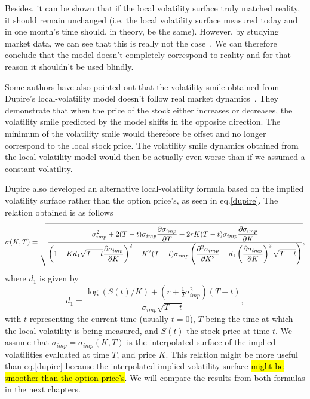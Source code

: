 Besides, it can be shown that if the local volatility surface truly matched reality, it should remain unchanged (i.e. the local volatility surface measured today and in one month's time should, in theory, be the same). However, by studying market data, we can see that this is really not the case~\cite{Wilmott3}. We can therefore conclude that the model doesn't completely correspond to reality and for that reason it shouldn't be used blindly.


Some authors have also pointed out that the volatility smile obtained from Dupire's local-volatility model doesn't follow real market dynamics~\cite{Hagan}. They demonstrate that when the price of the stock either increases or decreases, the volatility smile predicted by the model shifts in the opposite direction. The minimum of the volatility smile would therefore be offset and no longer correspond to the local stock price. The volatility smile dynamics obtained from the local-volatility model would then be actually even worse than if we assumed a constant volatility.


Dupire also developed an alternative local-volatility formula based on the implied volatility surface rather than the option price's, as seen in eq.\ref{dupire}.
The relation obtained is as follows
\begin{equation}\label{dupire2}
\sigma(K,T)=\sqrt{\frac{\displaystyle\sigma_{imp}^2+2(T-t)\sigma_{imp}\pdv{\sigma_{imp}}{T}+2rK(T-t)\sigma_{imp}\pdv{\sigma_{imp}}{K}}{\displaystyle\left(1+Kd_1\sqrt{T-t}\pdv{\sigma_{imp}}{K}\right)^2+K^2(T-t)\sigma_{imp}\left(\pdv{^2\sigma_{imp}}{K^2}-d_1\left(\pdv{\sigma_{imp}}{K}\right)^2\sqrt{T-t}\right)}},
\end{equation}
\noindent where $d_1$ is given by
\begin{equation}
d_1=\frac{\log(S(t)/K)+\left(r+\frac{1}{2}\sigma_{imp}^2\right)(T-t)}{\sigma_{imp}\sqrt{T-t}},
\end{equation}
\noindent with $t$ representing the current time (usually $t=0$), $T$ being the time at which the local volatility is being measured, and $S(t)$ the stock price at time $t$. We assume that $\sigma_{imp}=\sigma_{imp}(K,T)$ is the interpolated surface of the implied volatilities evaluated at time $T$, and price $K$.
This relation might be more useful than eq.\eqref{dupire} because the interpolated implied volatility surface \hl{might be smoother than the option price's}. We will compare the results from both formulas in the next chapters.




